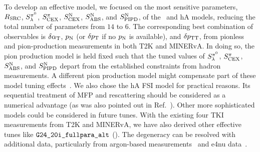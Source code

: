 To develop an effective model, we focused on the most sensitive parameters, $R_\textrm{SRC}$, $S_\lambda^{\pi^{0}}$, $S_\textrm{CEX}^{\pi}$, $S_\textrm{CEX}^\textrm{N}$, $S_\textrm{ABS}^\textrm{N}$, and $S_\textrm{PIPD}^\textrm{N}$, of the \sfcfg\ and hA models, reducing the total number of parameters from $14$ to $6$. The corresponding best combination of observables is $\delta\alpha_\textrm{T}$, $p_\textrm{N}$ (or $\delta p_\textrm{T}$ if no $p_\textrm{N}$ is available), and $\delta p_\textrm{TT}$, from pionless and pion-production measurements in both T2K and MINERvA. 
In doing so, the pion production model is held fixed such that the tuned values of $S_\lambda^{\pi^{0}}$, $S_\textrm{CEX}^{\pi}$, $S_\textrm{ABS}^\textrm{N}$, and $S_\textrm{PIPD}^\textrm{N}$ depart from the established constraints from hadron measurements. 
A different pion production model might compensate part of these model tuning effects~\cite{Yan:2024kkg}. 
We also chose the hA FSI model for practical reasons. Its sequential treatment of MFP and rescattering should be considered as a numerical advantage (as was also pointed out in Ref.~\cite{GENIE:2022qrc}). Other more sophisticated models could be considered in future tunes.  With the existing four TKI measurements from T2K and MINERvA, we have also derived other effective tunes like $\texttt{G24\_20i\_fullpara\_alt}$ (\gT). The degeneracy can be resolved with additional data, particularly from argon-based measurements~\cite{MicroBooNE:2022emb, MicroBooNE:2023cmw, MicroBooNE:2023tzj, MicroBooNE:2023wzy, MicroBooNE:2024tmp, MicroBooNE:2015bmn} and e4nu data~\cite{CLAS:2021neh}.